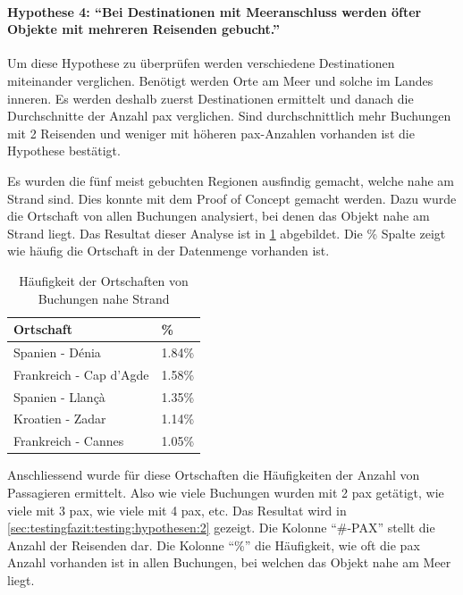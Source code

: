 \paragraph{Hypothese 4: "`Bei Destinationen mit Meeranschluss werden öfter Objekte mit mehreren Reisenden gebucht."'} Um diese Hypothese zu überprüfen werden verschiedene Destinationen miteinander verglichen. Benötigt werden Orte am Meer und solche im Landes inneren. Es werden deshalb zuerst Destinationen ermittelt und danach die Durchschnitte der Anzahl \gls{pax} verglichen. Sind durchschnittlich mehr Buchungen mit 2 Reisenden und weniger mit höheren \gls{pax}-Anzahlen vorhanden ist die Hypothese bestätigt.

Es wurden die fünf meist gebuchten Regionen ausfindig gemacht, welche nahe am Strand sind. Dies konnte mit dem Proof of Concept gemacht werden. Dazu wurde die Ortschaft von allen Buchungen analysiert, bei denen das Objekt nahe am Strand liegt. Das Resultat dieser Analyse ist in \cref{sec:testingfazit:testing:hypothesen:1} abgebildet. Die \% Spalte zeigt wie häufig die Ortschaft in der Datenmenge vorhanden ist.

\begin{table}[H] 
	\caption{Häufigkeit der Ortschaften von Buchungen nahe Strand}
	\centering
	\label{sec:testingfazit:testing:hypothesen:1}
	\begin{tabular}{ | l | l | } 
		\hline 
		\rowcolor{tableheadcolor}
		\bfseries Ortschaft & \bfseries \% \\ \hline 
		Spanien - Dénia & 1.84\% \\ \hline 
		Frankreich - Cap d'Agde & 1.58\% \\ \hline 
		Spanien - Llançà & 1.35\% \\ \hline 
		Kroatien - Zadar & 1.14\% \\ \hline 
		Frankreich - Cannes & 1.05\% \\ \hline 
	\end{tabular}
\end{table}

Anschliessend wurde für diese Ortschaften die Häufigkeiten der Anzahl von Passagieren ermittelt. Also wie viele Buchungen wurden mit 2 \gls{pax} getätigt, wie viele mit 3 \gls{pax}, wie viele mit 4 \gls{pax}, etc. Das Resultat wird in \cref{sec:testingfazit:testing:hypothesen:2} gezeigt. Die Kolonne "`\#-PAX"' stellt die Anzahl der Reisenden dar. Die Kolonne "`\%"' die Häufigkeit, wie oft die \gls{pax} Anzahl vorhanden ist in allen Buchungen, bei welchen das Objekt nahe am Meer liegt.

